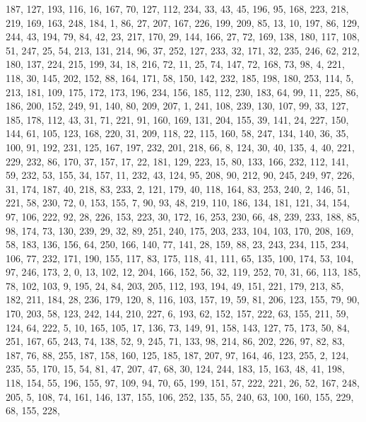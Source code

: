 \begin{DoxyCode}
       187, 127, 193, 116, 16, 167, 70, 127, 112, 234, 33, 43, 45, 196, 95, 168, 223, 218, 219, 169, 163, 248, 184,
       1, 86, 27, 207, 167, 226, 199, 209, 85, 13, 10, 197, 86, 129, 244, 43, 194, 79, 84, 42, 23, 217, 170, 29,
       144, 166, 27, 72, 169, 138, 180, 117, 108, 51, 247, 25, 54, 213, 131, 214, 96, 37, 252, 127, 233, 32, 171,
       32, 235, 246, 62, 212, 180, 137, 224, 215, 199, 34, 18, 216, 72, 11, 25, 74, 147, 72, 168, 73, 98, 4, 221,
       118, 30, 145, 202, 152, 88, 164, 171, 58, 150, 142, 232, 185, 198, 180, 253, 114, 5, 213, 181, 109, 175, 172,
       173, 196, 234, 156, 185, 112, 230, 183, 64, 99, 11, 225, 86, 186, 200, 152, 249, 91, 140, 80, 209, 207, 1,
       241, 108, 239, 130, 107, 99, 33, 127, 185, 178, 112, 43, 31, 71, 221, 91, 160, 169, 131, 204, 155, 39, 141,
       24, 227, 150, 144, 61, 105, 123, 168, 220, 31, 209, 118, 22, 115, 160, 58, 247, 134, 140, 36, 35, 100, 91,
       192, 231, 125, 167, 197, 232, 201, 218, 66, 8, 124, 30, 40, 135, 4, 40, 221, 229, 232, 86, 170, 37, 157, 17,
       22, 181, 129, 223, 15, 80, 133, 166, 232, 112, 141, 59, 232, 53, 155, 34, 157, 11, 232, 43, 124, 95, 208, 90,
       212, 90, 245, 249, 97, 226, 31, 174, 187, 40, 218, 83, 233, 2, 121, 179, 40, 118, 164, 83, 253, 240, 2, 146,
       51, 221, 58, 230, 72, 0, 153, 155, 7, 90, 93, 48, 219, 110, 186, 134, 181, 121, 34, 154, 97, 106, 222, 92,
       28, 226, 153, 223, 30, 172, 16, 253, 230, 66, 48, 239, 233, 188, 85, 98, 174, 73, 130, 239, 29, 32, 89, 251,
       240, 175, 203, 233, 104, 103, 170, 208, 169, 58, 183, 136, 156, 64, 250, 166, 140, 77, 141, 28, 159, 88,
       23, 243, 234, 115, 234, 106, 77, 232, 171, 190, 155, 117, 83, 175, 118, 41, 111, 65, 135, 100, 174, 53, 104,
       97, 246, 173, 2, 0, 13, 102, 12, 204, 166, 152, 56, 32, 119, 252, 70, 31, 66, 113, 185, 78, 102, 103, 9, 195,
       24, 84, 203, 205, 112, 193, 194, 49, 151, 221, 179, 213, 85, 182, 211, 184, 28, 236, 179, 120, 8, 116, 103,
       157, 19, 59, 81, 206, 123, 155, 79, 90, 170, 203, 58, 123, 242, 144, 210, 227, 6, 193, 62, 152, 157, 222,
       63, 155, 211, 59, 124, 64, 222, 5, 10, 165, 105, 17, 136, 73, 149, 91, 158, 143, 127, 75, 173, 50, 84, 251,
       167, 65, 243, 74, 138, 52, 9, 245, 71, 133, 98, 214, 86, 202, 226, 97, 82, 83, 187, 76, 88, 255, 187, 158,
       160, 125, 185, 187, 207, 97, 164, 46, 123, 255, 2, 124, 235, 55, 170, 15, 54, 81, 47, 207, 47, 68, 30, 124,
       244, 183, 15, 163, 48, 41, 198, 118, 154, 55, 196, 155, 97, 109, 94, 70, 65, 199, 151, 57, 222, 221, 26, 52,
       167, 248, 205, 5, 108, 74, 161, 146, 137, 155, 106, 252, 135, 55, 240, 63, 100, 160, 155, 229, 68, 155, 228,

\end{DoxyCode}

